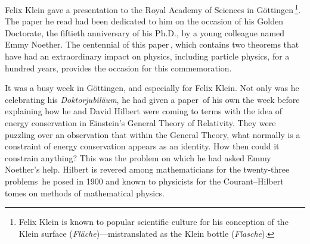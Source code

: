 \documentclass[twoside,symmetric]{tufte-handout}
\begin{document}

 Felix Klein gave a presentation to the Royal Academy of Sciences in G\"ottingen$\,$\footnote{Felix Klein is known to popular scientific culture for his conception of the Klein surface (\emph{Fläche})---mistranslated as the Klein bottle (\emph{Flasche}).}. The paper he read had been dedicated to him on the occasion of his Golden Doctorate, the fiftieth anniversary of his Ph.D., by a young colleague named Emmy Noether. The centennial of this paper$\,$\cite{Noether:1918zz,Noether2011}, which contains two theorems that have had an extraordinary impact on physics, including particle physics, for a hundred years, provides the occasion for this commemoration.

It was a busy week in G\"ottingen, and especially for Felix Klein. Not only was he celebrating his \emph{Doktorjubil\"aum}, he had given a paper$\,$\cite{Klein1918} of his own the week before explaining how he and David Hilbert were coming to terms with the idea of energy conservation in Einstein's General Theory of Relativity. They were puzzling over an observation that within the General Theory, what normally is a constraint of energy conservation appears as an identity. How then could it constrain anything? This was the problem on which he had asked Emmy Noether's help. Hilbert is revered among mathematicians for the twenty-three problems$\,$\cite{HilbertProbs} he posed in 1900 and known to physicists for the Courant--Hilbert tomes on methods of mathematical physics.
\end{document}
